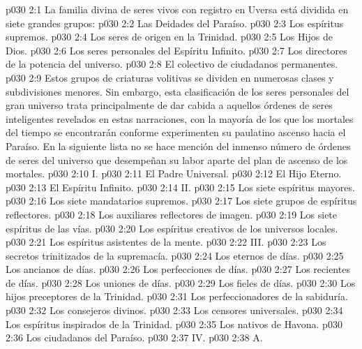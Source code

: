 \vs p030 2:1 La familia divina de seres vivos con registro en Uversa está dividida en siete grandes grupos:
\vs p030 2:2 Las Deidades del Paraíso.
\vs p030 2:3 Los espíritus supremos.
\vs p030 2:4 Los seres de origen en la Trinidad.
\vs p030 2:5 Los Hijos de Dios.
\vs p030 2:6 Los seres personales del Espíritu Infinito.
\vs p030 2:7 Los directores de la potencia del universo.
\vs p030 2:8 El colectivo de ciudadanos permanentes.
\vs p030 2:9 \pc Estos grupos de criaturas volitivas se dividen en numerosas clases y subdivisiones menores. Sin embargo, esta clasificación de los seres personales del gran universo trata principalmente de dar cabida a aquellos órdenes de seres inteligentes revelados en estas narraciones, con la mayoría de los que los mortales del tiempo se encontrarán conforme experimenten su paulatino ascenso hacia el Paraíso. En la siguiente lista no se hace mención del inmenso número de órdenes de seres del universo que desempeñan su labor aparte del plan de ascenso de los mortales.
\vs p030 2:10 \pc I. 
\vs p030 2:11 El Padre Universal.
\vs p030 2:12 El Hijo Eterno.
\vs p030 2:13 El Espíritu Infinito.
\vs p030 2:14 \pc II. 
\vs p030 2:15 Los siete espíritus mayores.
\vs p030 2:16 Los siete mandatarios supremos.
\vs p030 2:17 Los siete grupos de espíritus reflectores.
\vs p030 2:18 Los auxiliares reflectores de imagen.
\vs p030 2:19 Los siete espíritus de las vías.
\vs p030 2:20 Los espíritus creativos de los universos locales.
\vs p030 2:21 Los espíritus asistentes de la mente.
\vs p030 2:22 \pc III. 
\vs p030 2:23 Los secretos trinitizados de la supremacía.
\vs p030 2:24 Los eternos de días.
\vs p030 2:25 Los ancianos de días.
\vs p030 2:26 Los perfecciones de días.
\vs p030 2:27 Los recientes de días.
\vs p030 2:28 Los uniones de días.
\vs p030 2:29 Los fieles de días.
\vs p030 2:30 Los hijos preceptores de la Trinidad.
\vs p030 2:31 Los perfeccionadores de la sabiduría.
\vs p030 2:32 Los consejeros divinos.
\vs p030 2:33 Los censores universales.
\vs p030 2:34 Los espíritus inspirados de la Trinidad.
\vs p030 2:35 Los nativos de Havona.
\vs p030 2:36 Los ciudadanos del Paraíso.
\vs p030 2:37 \pc IV. 
\vs p030 2:38 \pc A. 
